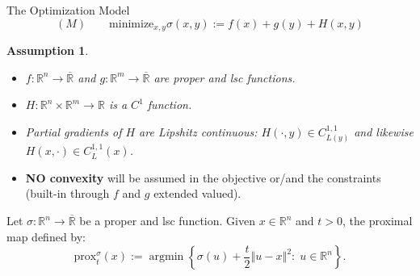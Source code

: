 \documentclass[9pt,handout]{beamer} %
\newtheorem{assumption}{Assumption}
\newcommand{\prox}{\mathrm{prox}} %
\newcommand{\rr}{\mathbb{R}} %
\newcommand{\norm}[1]{\left\Vert {#1} \right\Vert} %
\newcommand{\argmin}{\operatorname{argmin}}
\begin{document}
    \begin{frame}{The Optimization Model}
        \begin{equation*}
            (M) \qquad \mbox{minimize}_{x , y} \sigma\left(x , y\right) := f\left(x\right) + g\left(y\right) + H\left(x , y\right)
        \end{equation*}
        \pause
        \begin{assumption} \label{AssumptionsA}
            \begin{itemize}
                \item[$\rm{(i)}$] $f : \rr^{n} \rightarrow \overline{\rr}$ and $g : \rr^{m} \rightarrow \overline{\rr}$ are proper and lsc functions.
                \item[$\rm{(ii)}$] $H : \rr^{n} \times \rr^{m} \rightarrow \rr$ is a $C^{1}$ function.
                \item[$\rm{(iii)}$] Partial gradients of $H$ are Lipshitz continuous: $H\left(\cdot , y\right) \in C^{1,1}_{L(y)}$ and likewise $H\left(x , \cdot\right) \in C^{1,1}_L(x)$.
            \end{itemize}
        \end{assumption}
        \pause
        \begin{itemize}[<+->]
            \item {\bf NO convexity} will be assumed in the objective or/and the constraints (built-in through $f$ and $g$ extended valued).
        \end{itemize}
        \pause
        Let $\sigma : \rr^{n} \rightarrow \overline{\rr}$ be a proper and lsc function. Given 
		$x \in \rr^{n}$ and $t > 0$, the proximal map defined by:
        \begin{equation*}
            \prox_{t}^{\sigma}\left(x\right) := \argmin \left\{ \sigma\left(u\right) + 
            \frac{t}{2}\norm{u - x}^{2} : \; u \in \rr^{n} \right\}.
        \end{equation*}
    \end{frame}
\end{document}
